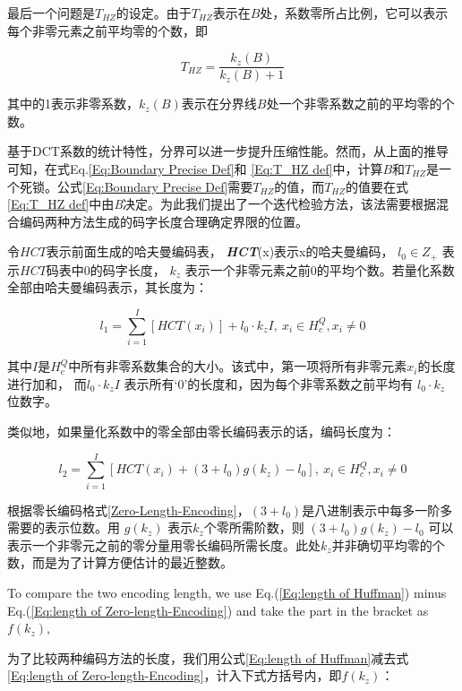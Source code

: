 最后一个问题是$T_{HZ}$的设定。由于$T_{HZ}$表示在$B$处，系数零所占比例，它可以表示每个非零元素之前平均零的个数，即


\begin{equation}\label{Eq:T_HZ def}
  T_{HZ}=\frac{k_z(B)}{k_z(B)+1}
\end{equation}


其中的1表示非零系数，$k_z(B)$表示在分界线$B$处一个非零系数之前的平均零的个数。

基于DCT系数的统计特性，分界可以进一步提升压缩性能。然而，从上面的推导可知，在式Eq.\ref{Eq:Boundary Precise Def}和 \ref{Eq:T_HZ def}中，计算$B$和$T_{HZ}$是一个死锁。公式\ref{Eq:Boundary Precise Def}需要$T_{HZ}$的值，而$T_{HZ}$的值要在式\ref{Eq:T_HZ def}中由\emph{B}决定。为此我们提出了一个迭代检验方法，该法需要根据混合编码两种方法生成的码字长度合理确定界限的位置。

令$HCT$表示前面生成的哈夫曼编码表，
\textbf{\emph{HCT}}(x)表示x的哈夫曼编码，
$l_0\in Z_+$ 表示$HCT$码表中0的码字长度，
$k_z$ 表示一个非零元素之前0的平均个数。若量化系数全部由哈夫曼编码表示，其长度为：


\begin{equation}\label{Eq:length of Huffman}
  l_1=\sum_{i=1}^I [HCT(x_i)]+l_0\cdot k_zI,\ x_i\in H_c^Q, x_i\neq 0
\end{equation}


其中$I$是$H_c^Q$中所有非零系数集合的大小。该式中，第一项将所有非零元素$x_i$的长度进行加和，
而$l_0\cdot k_zI$ 表示所有‘0’的长度和，因为每个非零系数之前平均有 $l_0\cdot k_z$ 位数字。


类似地，如果量化系数中的零全部由零长编码表示的话，编码长度为：


\begin{equation}\label{Eq:length of Zero-length-Encoding}
  l_2=\sum_{i=1}^I [HCT(x_i)+(3+l_0)g(k_z)-l_0],\ x_i\in H_c^Q, x_i\neq 0
\end{equation}


根据零长编码格式\ref{Zero-Length-Encoding}，$(3+l_0)$是八进制表示中每多一阶多需要的表示位数。用 $g(k_z)$ 表示$k_z$个零所需阶数，则 $(3+l_0)g(k_z)-l_0$ 可以表示一个非零元之前的零分量用零长编码所需长度。此处$k_z$并非确切平均零的个数，而是为了计算方便估计的最近整数。

To compare the two encoding length, we use Eq.(\ref{Eq:length of Huffman}) minus Eq.({\ref{Eq:length of Zero-length-Encoding}}) and take the part in the bracket as $f(k_z)$,

为了比较两种编码方法的长度，我们用公式\ref{Eq:length of Huffman}减去式\ref{Eq:length of Zero-length-Encoding}，计入下式方括号内，即$f(k_z)$：


